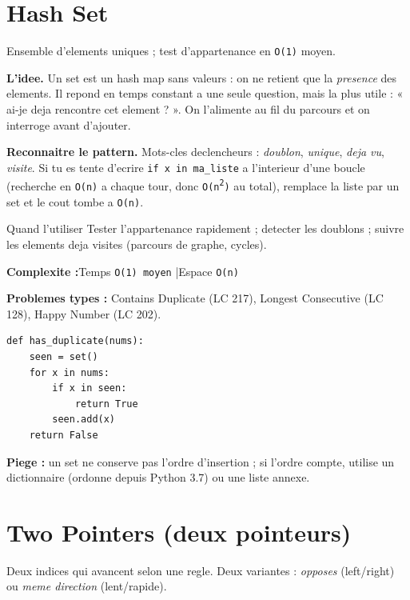 \documentclass[11pt,a4paper]{article}
\newcommand{\complexite}[2]{%
  \noindent\textbf{Complexite :}\quad Temps \texttt{#1} \quad|\quad Espace \texttt{#2}\par\smallskip}
\newcommand{\leetcode}[1]{\noindent\textbf{Problemes types :} #1\par\medskip}
\begin{document}
\section{Hash Set}
Ensemble d'elements uniques ; test d'appartenance en \texttt{O(1)} moyen.

\textbf{L'idee.} Un set est un hash map sans valeurs : on ne retient que la
\emph{presence} des elements. Il repond en temps constant a une seule question,
mais la plus utile : « ai-je deja rencontre cet element ? ». On l'alimente au fil
du parcours et on interroge avant d'ajouter.

\textbf{Reconnaitre le pattern.} Mots-cles declencheurs : \emph{doublon},
\emph{unique}, \emph{deja vu}, \emph{visite}. Si tu es tente d'ecrire
\texttt{if x in ma\_liste} a l'interieur d'une boucle (recherche en \texttt{O(n)}
a chaque tour, donc \texttt{O(n\textsuperscript{2})} au total), remplace la liste
par un set et le cout tombe a \texttt{O(n)}.

\begin{infobox}{Quand l'utiliser}
Tester l'appartenance rapidement ; detecter les doublons ; suivre les elements
deja visites (parcours de graphe, cycles).
\end{infobox}

\complexite{O(1) moyen}{O(n)}
\leetcode{Contains Duplicate (LC 217), Longest Consecutive (LC 128), Happy Number (LC 202).}

\begin{lstlisting}
def has_duplicate(nums):
    seen = set()
    for x in nums:
        if x in seen:
            return True
        seen.add(x)
    return False
\end{lstlisting}

\textbf{Piege :} un set ne conserve pas l'ordre d'insertion ; si l'ordre compte,
utilise un dictionnaire (ordonne depuis Python 3.7) ou une liste annexe.

\section{Two Pointers (deux pointeurs)}
Deux indices qui avancent selon une regle. Deux variantes : \emph{opposes}
(left/right) ou \emph{meme direction} (lent/rapide).
\end{document}
